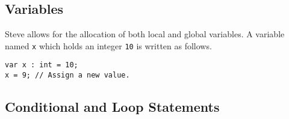 %
%
%
% 
%
%
%

\subsection{Variables} \label{tut:variable}

Steve allows for the allocation of both local and global variables. 
A variable named \texttt{x} which holds an integer \texttt{10} is written
as follows. 

\begin{codepage}
\begin{lstlisting}
var x : int = 10;
x = 9; // Assign a new value.
\end{lstlisting}
\end{codepage}

\subsection{Conditional and Loop Statements} \label{tut:condition}

